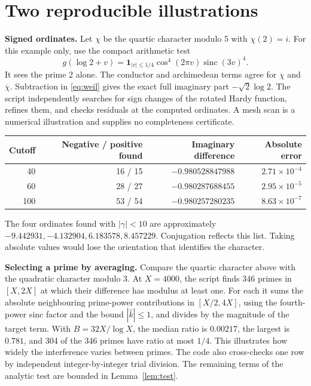 \documentclass[11pt]{article}
\newcommand{\sinc}{\operatorname{sinc}}\newcommand{\ord}{\operatorname{ord}}
\newcommand{\one}{\mathbf1}
\begin{document}
\section{Two reproducible illustrations}
\textbf{Signed ordinates.} Let \(\chi\) be the quartic character modulo 5 with \(\chi(2)=i\). For this example only, use the compact arithmetic test
\[
 g(\log 2+v)=\one_{|v|\le1/4}\cos^4(2\pi v)\sinc(3v)^4.
\]
It sees the prime 2 alone. The conductor and archimedean terms agree for \(\chi\) and \(\overline\chi\). Subtraction in \eqref{eq:weil} gives the exact full imaginary part \(-\sqrt2\log2\). The script independently searches for sign changes of the rotated Hardy function, refines them, and checks residuals at the computed ordinates. A mesh scan is a numerical illustration and supplies no completeness certificate.
\begin{center}
\begin{tabular}{rrrr}
\toprule
Cutoff & Negative / positive found & Imaginary difference & Absolute error\\
\midrule
40 & 16 / 15 & $-0.980528847988$ & $2.71\times10^{-4}$\\
60 & 28 / 27 & $-0.980287688455$ & $2.95\times10^{-5}$\\
100 & 53 / 54 & $-0.980257280235$ & $8.63\times10^{-7}$\\
\bottomrule
\end{tabular}
\end{center}
The four ordinates found with \(|\gamma|<10\) are approximately \(-9.442931,-4.132904,6.183578,8.457229\). Conjugation reflects this list. Taking absolute values would lose the orientation that identifies the character.

\textbf{Selecting a prime by averaging.} Compare the quartic character above with the quadratic character modulo 3. At \(X=4000\), the script finds 346 primes in \([X,2X]\) at which their difference has modulus at least one. For each it sums the absolute neighbouring prime-power contributions in \([X/2,4X]\), using the fourth-power sinc factor and the bound \(|\widehat k|\le1\), and divides by the magnitude of the target term. With \(B=32X/\log X\), the median ratio is \(0.00217\), the largest is \(0.781\), and 304 of the 346 primes have ratio at most \(1/4\). This illustrates how widely the interference varies between primes. The code also cross-checks one row by independent integer-by-integer trial division. The remaining terms of the analytic test are bounded in Lemma~\ref{lem:test}.
\end{document}
